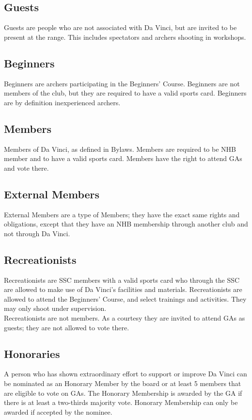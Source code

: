 \documentclass[a4paper]{article}
\newcommand{\Asta}{Bylaws} %
\begin{document}
\subsection{Guests}
Guests are people who are not associated with Da Vinci, but are invited to be present at the range. This includes spectators and archers shooting in workshops.

\subsection{Beginners}
Beginners are archers participating in the Beginners' Course. Beginners are not members of the club, but they are required to have a valid sports card. Beginners are by definition inexperienced archers.

\subsection{Members}
Members of Da Vinci, as defined in \Asta. Members are required to be NHB member and to have a valid sports card. Members have the right to attend GAs and vote there.

\subsection{External Members}
External Members are a type of Members; they have the exact same rights and obligations, except that they have an NHB membership through another club and not through Da Vinci.

\subsection{Recreationists}
Recreationists are SSC members with a valid sports card who through the SSC are allowed to make use of Da Vinci's facilities and materials. Recreationists are allowed to attend the Beginners' Course, and select trainings and activities. They may only shoot under supervision. \\

Recreationists are not members. As a courtesy they are invited to attend GAs as guests; they are not allowed to vote there.

\subsection{Honoraries}
A person who has shown extraordinary effort to support or improve Da Vinci can be nominated as an Honorary Member by the board or at least 5 members that are eligible to vote on GAs.
The Honorary Membership is awarded by the GA if there is at least a two-thirds majority vote. Honorary Membership can only be awarded if accepted by the nominee. \\
\end{document}
